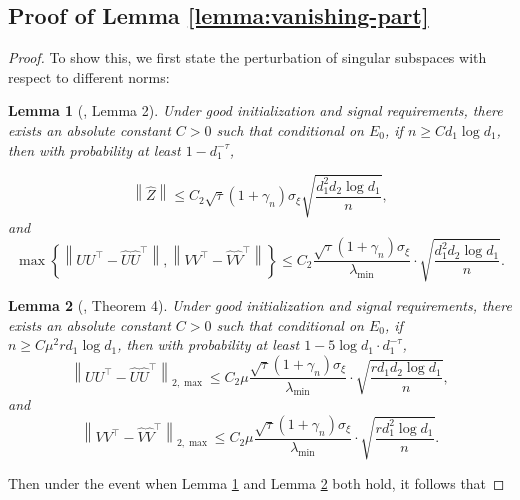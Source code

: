 \documentclass[12pt]{article}
\newcommand{\norm}[1]{\left\lVert#1\right\rVert}
\newtheorem{Lemma}{Lemma}
\theoremstyle{plain}
\begin{document}
\subsection{Proof of Lemma \ref{lemma:vanishing-part}}
\begin{proof}
    To show this, we first state the perturbation of singular subspaces with respect to different norms:
\begin{Lemma}[\cite{xia2021statistical}, Lemma 2]\label{lemma:subspace-perturb}
        Under good initialization and signal requirements, there exists an absolute constant $C>0$ such that conditional on $E_0$, if $n \geq C d_1 \log d_1$, then with probability at least $1- d_1^{-\tau}$,

$$
\norm{\widehat{Z}}\le C_2 \sqrt{\tau}(1+\gamma_{n})\sigma_{\xi}\sqrt{\frac{d_1^2 d_2 \log d_1}{n}},  
$$
and 
$$
\max \left\{ \norm{UU^\top-\widehat{U}\widehat{U}^\top } ,\norm{VV^\top-\widehat{V}\widehat{V}^\top } \right\} \leq C_2\frac{\sqrt{\tau}\left(1+\gamma_{n}\right) \sigma_{\xi}}{\lambda_{\min}} \cdot \sqrt{\frac{d_1^2 d_2 \log d_1}{n}}.  
$$
    \end{Lemma}

\begin{Lemma}[\cite{xia2021statistical}, Theorem 4]\label{lemma:subspace-perturb-max}
         Under good initialization and signal requirements, there exists an absolute constant $C>0$ such that conditional on $E_0$, if $n \geq C \mu^2 r d_1 \log d_1$, then with probability at least $1- 5\log d_1 \cdot d_1^{-\tau}$,
$$
\norm{UU^\top-\widehat{U}\widehat{U}^\top }_{2,\max}  \leq C_2 \mu\frac{\sqrt{\tau}\left(1+\gamma_{n}\right) \sigma_{\xi}}{\lambda_{\min}} \cdot \sqrt{\frac{rd_1 d_2 \log d_1}{n}},  
$$
and 
$$
\norm{VV^\top-\widehat{V}\widehat{V}^\top }_{2,\max}  \leq C_2\mu\frac{\sqrt{\tau}\left(1+\gamma_{n}\right) \sigma_{\xi}}{\lambda_{\min}} \cdot \sqrt{\frac{rd_1^2\log d_1}{n}}.  
$$
    \end{Lemma}
Then under the event when Lemma \ref{lemma:subspace-perturb} and Lemma \ref{lemma:subspace-perturb-max} both hold, it follows that


\end{proof}
\end{document}
